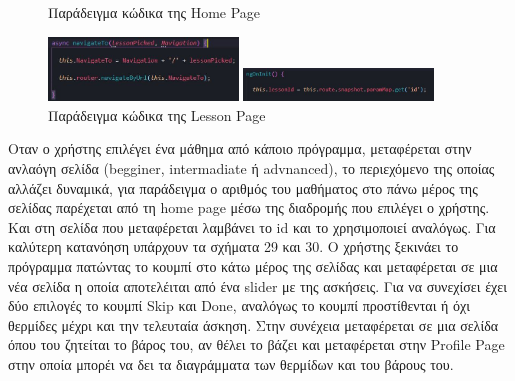 \documentclass[a4paper,12pt]{article}
\begin{document}
			\begin{figure}
				\caption{Παράδειγμα κώδικα της Home Page}
				\vspace*{0.1cm}
				\includegraphics[width=0.45\textwidth]{navig}
				
				\caption{Παράδειγμα κώδικα της Lesson Page}
				\vspace*{0.1cm}
				\includegraphics[width=0.45\textwidth]{navig2}
				
			\end{figure}
			Οταν ο χρήστης επιλέγει ένα μάθημα από κάποιο πρόγραμμα, μεταφέρεται στην ανλαόγη σελίδα (begginer, intermadiate ή advnanced), το περιεχόμενο της οποίας αλλάζει δυναμικά,  για παράδειγμα ο αριθμός του μαθήματος 
			στο πάνω μέρος της σελίδας παρέχεται από τη home page μέσω της διαδρομής που επιλέγει ο χρήστης. Και στη σελίδα που μεταφέρεται λαμβάνει το id
			και το χρησιμοποιεί αναλόγως. Για καλύτερη κατανόηση υπάρχουν τα σχήματα 29 και 30.
			\clearpage
			\newpage	
			Ο χρήστης ξεκινάει το πρόγραμμα πατώντας το κουμπί στο κάτω μέρος της σελίδας και μεταφέρεται σε μια νέα σελίδα η οποία αποτελέιται από ένα slider
			με της ασκήσεις. Για να συνεχίσει έχει δύο επιλογές το κουμπί Skip και Done, αναλόγως το κουμπί προστίθενται ή όχι θερμίδες μέχρι και την τελευταία
			άσκηση. Στην συνέχεια μεταφέρεται σε μια σελίδα όπου του ζητείται το βάρος του, αν θέλει το βάζει και μεταφέρεται στην Profile Page στην οποία μπορέι να 
			δει τα διαγράμματα των θερμίδων και του βάρους του.
			\vspace{.5cm}
\end{document}

